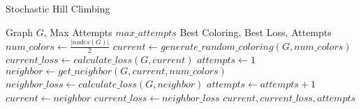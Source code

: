 \documentclass{article}
\begin{document}
\begin{algorithm}
\caption{Stochastic Hill Climbing}
\begin{algorithmic}[1]
\REQUIRE Graph $G$, Max Attempts $max\_attempts$
\ENSURE Best Coloring, Best Loss, Attempts
\STATE $num\_colors \gets \frac{|nodes(G)|}{2}$
\STATE $current \gets generate\_random\_coloring(G, num\_colors)$
\STATE $current\_loss \gets calculate\_loss(G, current)$
\STATE $attempts \gets 1$
    \STATE $neighbor \gets get\_neighbor(G, current, num\_colors)$
    \STATE $neighbor\_loss \gets calculate\_loss(G, neighbor)$
    \STATE $attempts \gets attempts + 1$
        \STATE $current \gets neighbor$
        \STATE $current\_loss \gets neighbor\_loss$
            \BREAK
        \ENDIF
    \ENDIF
\ENDWHILE
\RETURN $current, current\_loss, attempts$
\end{algorithmic}
\end{algorithm}
\end{document}
